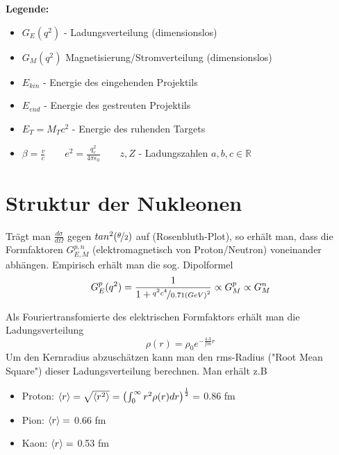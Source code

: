 \documentclass[Ex4_Zusammenfassung.tex]{subfiles}
\begin{document}
\textbf{Legende:} 
\begin{itemize} 
\item $G_E(q^2)$ - Ladungsverteilung (dimensionslos)
\item $G_M(q^2)$ Magnetisierung/Stromverteilung (dimensionslos)
\item $E_{kin}$ - Energie des eingehenden Projektils 
\item $E_ {end}$ - Energie des gestreuten Projektils
\item $E_T = M_T c^2$ - Energie des ruhenden Targets 
\item $\beta = \frac{v}{c} \qquad e^2=\frac{q_e^2}{4\pi \epsilon_0} \qquad z,Z$ - Ladungszahlen \qquad $a,b,c \in \mathbb{R}$
\end{itemize}
\section{Struktur der Nukleonen}
Trägt man $\frac{d\sigma}{d\Omega}$ gegen $tan^2(\nicefrac{\theta}{2})$ auf (Rosenbluth-Plot), so erhält man, dass die Formfaktoren $G_{E,M}^{p,n}$ (elektromagnetisch von Proton/Neutron) voneinander abhängen. Empirisch erhält man die sog. Dipolformel
\begin{equation}
G_E^p(q^2) = \frac{1}{1+ \nicefrac{q^2c^4}{0.71 (GeV)^2}} \propto G_M^p \propto G_M^n
\end{equation}
\begin{figure}[H]
\centering
{}
\end{figure}
Als Fouriertransfomierte des elektrischen Formfaktors erhält man die Ladungsverteilung
\begin{equation}
\rho(r) = \rho_0  e^{-\frac{4.3}{fm} r}
\end{equation}
Um den Kernradius abzuschätzen kann man den rms-Radius ("Root Mean Square") dieser Ladungsverteilung berechnen. Man erhält z.B 
\begin{itemize}
\item Proton: $\braket{r} = \sqrt{\braket{r^2}} = \left( \int_0^{\infty} r^2 \rho(r) dr \right)^{\frac{1}{2}} =$ 0.86 fm
\item Pion: $\braket{r} =$ 0.66 fm 
\item Kaon: $\braket{r} =$ 0.53 fm 
\end{itemize}
\end{document}
